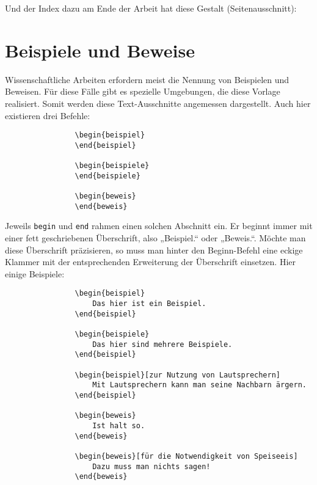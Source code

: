 			Und der Index dazu am Ende der Arbeit hat diese Gestalt (Seitenausschnitt): 
			
			\begin{center}
			\end{center}
			
		\section{Beispiele und Beweise}
		
			Wissenschaftliche Arbeiten erfordern meist die Nennung von Beispielen und Beweisen. Für diese Fälle gibt es spezielle Umgebungen, die diese Vorlage realisiert. Somit werden diese Text-Ausschnitte angemessen dargestellt. Auch hier existieren drei Befehle: 
			
			\begin{verbatim}
				\begin{beispiel}
				\end{beispiel}
				
				\begin{beispiele}
				\end{beispiele}
				
				\begin{beweis}
				\end{beweis}
			\end{verbatim}\newline
			
			Jeweils \texttt{begin} und \texttt{end} rahmen einen solchen Abschnitt ein. Er beginnt immer mit einer fett geschriebenen Überschrift, also „Beispiel.“ oder „Beweis.“. Möchte man diese Überschrift präzisieren, so muss man hinter den Beginn-Befehl eine eckige Klammer mit der entsprechenden Erweiterung der Überschrift einsetzen. Hier einige Beispiele: 
			
			\begin{verbatim}
				\begin{beispiel}
					Das hier ist ein Beispiel.
				\end{beispiel}
				
				\begin{beispiele}
					Das hier sind mehrere Beispiele.
				\end{beispiel}
				
				\begin{beispiel}[zur Nutzung von Lautsprechern]
					Mit Lautsprechern kann man seine Nachbarn ärgern.
				\end{beispiel}
				
				\begin{beweis}
					Ist halt so.
				\end{beweis}
				
				\begin{beweis}[für die Notwendigkeit von Speiseeis]
					Dazu muss man nichts sagen!
				\end{beweis}
			\end{verbatim}\newline
			

